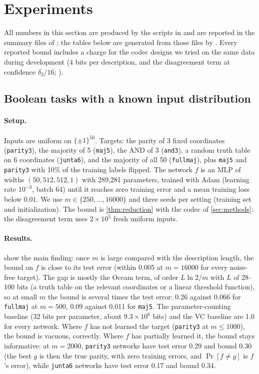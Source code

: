 \section{Experiments}\label{sec:experiments}

All numbers in this section are produced by the scripts in  and are reported in the summary files of ; the tables below are generated from those files by . Every reported bound includes a charge for the codec designs we tried on the same data during development (4 bits per description, and the disagreement term at confidence $\delta_2/16$; ).

\subsection{Boolean tasks with a known input distribution}\label{sec:exp-bool}

\paragraph{Setup.} Inputs are uniform on $\{\pm1\}^{50}$. Targets: the parity of 3 fixed coordinates (\texttt{parity3}), the majority of 5 (\texttt{maj5}), the AND of 3 (\texttt{and3}), a random truth table on 6 coordinates (\texttt{junta6}), and the majority of all 50 (\texttt{fullmaj}), plus \texttt{maj5} and \texttt{parity3} with 10\% of the training labels flipped. The network $f$ is an MLP of widths $(50,512,512,1)$ with 289{,}281 parameters, trained with Adam (learning rate $10^{-3}$, batch 64) until it reaches zero training error and a mean training loss below $0.01$. We use $m\in\{250,\dots,16000\}$ and three seeds per setting (training set and initialization). The bound is \cref{thm:reduction} with the codec of \cref{sec:methods}; the disagreement term uses $2\times10^5$ fresh uniform inputs.

\paragraph{Results.}  show the main finding: once $m$ is large compared with the description length, the bound on $f$ is close to its test error (within 0.005 at $m=16000$ for every noise-free target). The gap is mostly the Occam term, of order $L\ln2/m$ with $L$ of 28--100 bits (a truth table on the relevant coordinates or a linear threshold function), so at small $m$ the bound is several times the test error: 0.26 against 0.066 for \texttt{fullmaj} at $m=500$, 0.09 against 0.011 for \texttt{maj5}. The parameter-counting baseline (32 bits per parameter, about $9.3\times10^6$ bits) and the VC baseline are 1.0 for every network. Where $f$ has not learned the target (\texttt{parity3} at $m\le1000$), the bound is vacuous, correctly. Where $f$ has partially learned it, the bound stays informative: at $m=2000$, \texttt{parity3} networks have test error $0.29$ and bound $0.30$ (the best $g$ is then the true parity, with zero training errors, and $\Pr[f\ne g]$ is $f$'s error), while \texttt{junta6} networks have test error 0.17 and bound 0.34.

